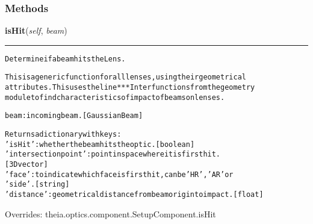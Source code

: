   \subsubsection{Methods}

    \vspace{0.5ex}

\hspace{.8\funcindent}\begin{boxedminipage}{\funcwidth}

    \raggedright \textbf{isHit}(\textit{self}, \textit{beam})

    \vspace{-1.5ex}

    \rule{\textwidth}{0.5\fboxrule}
\setlength{\parskip}{2ex}
\begin{alltt}
Determine if a beam hits the Lens.

This is a generic function for all lenses, using their geometrical
attributes. This uses the line***Inter functions from the geometry
module to find characteristics of impact of beams on lenses.

beam: incoming beam. [GaussianBeam]

Returns a dictionary with keys:
    'isHit': whether the beam hits the optic. [boolean]
    'intersection point': point in space where it is first hit.
            [3D vector]
    'face': to indicate which face is first hit, can be 'HR', 'AR' or
        'side'. [string]
    'distance': geometrical distance from beam origin to impact. [float]
\end{alltt}

\setlength{\parskip}{1ex}
      Overrides: theia.optics.component.SetupComponent.isHit

    \end{boxedminipage}

    \label{theia:optics:lens:Lens:hit}

    \vspace{0.5ex}

